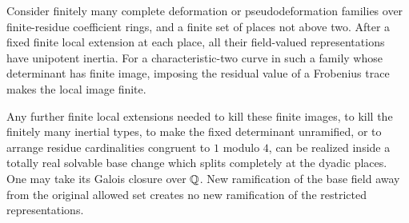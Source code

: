 \begin{lemma}
\label{lem:inertia-basechange}
Consider finitely many complete deformation or pseudodeformation
families over finite-residue coefficient rings, and a finite set of
places not above two.  After a fixed finite local extension at each
place, all their field-valued representations have unipotent inertia.
For a characteristic-two curve in such a family whose determinant
has finite image, imposing the residual value of a Frobenius trace
makes the local image finite.

Any further finite local extensions needed to kill these finite
images, to kill the finitely many inertial types, to make the fixed
determinant unramified, or to arrange residue cardinalities
congruent to $1$ modulo $4$, can be realized inside a totally real
solvable base change which splits completely at the dyadic places.
One may take its Galois closure over $\mathbb Q$.  New ramification of the
base field away from the original allowed set creates no new
ramification of the restricted representations.
\end{lemma}


